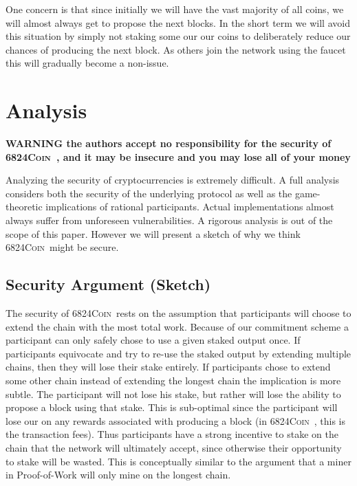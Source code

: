 \documentclass{article}
\newcommand{\coin}{ \textsc{6824Coin}\ }
\begin{document}
One concern is that since initially we will have the vast majority of all coins, we will almost always get to propose the next blocks. In the short term we will avoid this situation by simply not staking some our our coins to deliberately reduce our chances of producing the next block. As others join the network using the faucet this will gradually become a non-issue. 

\section{Analysis}
\large{ \color{red}  { \textbf{ WARNING the authors accept no responsibility for the security of \coin, and it may be insecure and you may lose all of your money } } } 

Analyzing the security of cryptocurrencies is extremely difficult. A full analysis considers both the security of the underlying protocol as well as the game-theoretic implications of rational participants. Actual implementations almost always suffer from unforeseen vulnerabilities. A rigorous analysis is out of the scope of this paper. However we will present a sketch of why we think \coin might be secure.

\subsection{Security Argument (Sketch)}\label{security}

The security of \coin rests on the assumption that participants will choose to extend the chain with the most total work. Because of our commitment scheme a participant can only safely chose to use a given staked output once. If participants equivocate and try to re-use the staked output by extending multiple chains, then they will lose their stake entirely. If participants chose to extend some other chain instead of extending the longest chain the implication is more subtle. The participant will not lose his stake, but rather will lose the ability to propose a block using that stake. This is sub-optimal since the participant will lose our on any rewards associated with producing a block (in \coin, this is the transaction fees). Thus participants have a strong incentive to stake on the chain that the network will ultimately accept, since otherwise their opportunity to stake will be wasted. This is conceptually similar to the argument that a miner in Proof-of-Work will only mine on the longest chain. 
\end{document}
